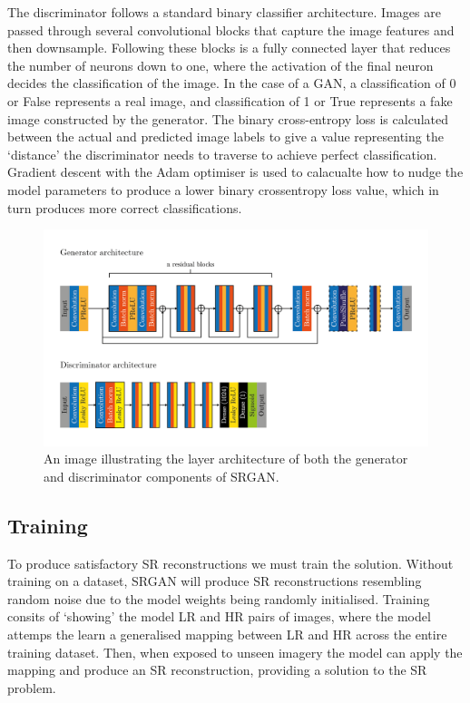 The discriminator follows a standard binary classifier architecture. Images are passed through several convolutional blocks that capture the image features and then downsample. Following these blocks is a fully connected layer that reduces the number of neurons down to one, where the activation of the final neuron decides the classification of the image. In the case of a GAN, a classification of 0 or False represents a real image, and classification of 1 or True represents a fake image constructed by the generator. The binary cross-entropy loss is calculated between the actual and predicted image labels to give a value representing the `distance' the discriminator needs to traverse to achieve perfect classification. Gradient descent with the Adam optimiser is used to calacualte how to nudge the model parameters to produce a lower binary crossentropy loss value, which in turn produces more correct classifications.
\begin{figure}
    \includegraphics[width=\linewidth]{./assets/SRGAN architecture.png}
    \caption{An image illustrating the layer architecture of both the generator and discriminator components of SRGAN.}
    \label{fig:srgan_architecture}
\end{figure}

\subsection{Training}
To produce satisfactory SR reconstructions we must train the solution. Without training on a dataset, SRGAN will produce SR reconstructions resembling random noise due to the model weights being randomly initialised. Training consits of `showing' the model LR and HR pairs of images, where the model attemps the learn a generalised mapping between LR and HR across the entire training dataset. Then, when exposed to unseen imagery the model can apply the mapping and produce an SR reconstruction, providing a solution to the SR problem.

